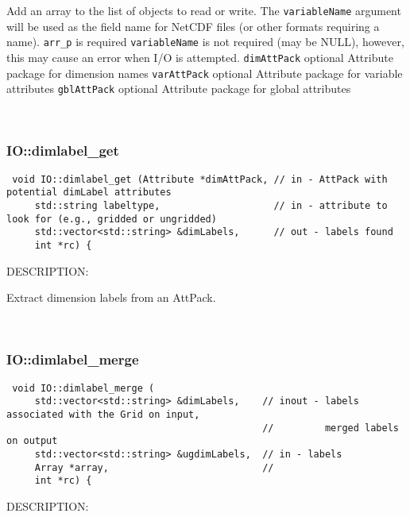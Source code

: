         Add an array to the list of objects to read or write. The
        {\tt variableName} argument will be used as the field name for
        NetCDF files (or other formats requiring a name).
        {\tt arr_p} is required
        {\tt variableName} is not required (may be NULL), however, this
           may cause an error when I/O is attempted.
        {\tt dimAttPack} optional Attribute package for dimension names
        {\tt varAttPack} optional Attribute package for variable attributes
        {\tt gblAttPack} optional Attribute package for global attributes
   
 
\mbox{}\hrulefill\ 
 
\subsubsection [IO::dimlabel\_get] {IO::dimlabel\_get}


  
\begin{verbatim} void IO::dimlabel_get (Attribute *dimAttPack, // in - AttPack with potential dimLabel attributes
     std::string labeltype,                    // in - attribute to look for (e.g., gridded or ungridded)
     std::vector<std::string> &dimLabels,      // out - labels found
     int *rc) {\end{verbatim}
{\sf DESCRIPTION:\\ }


        Extract dimension labels from an AttPack.
   
 
\mbox{}\hrulefill\ 
 
\subsubsection [IO::dimlabel\_merge] {IO::dimlabel\_merge}


  
\begin{verbatim} void IO::dimlabel_merge (
     std::vector<std::string> &dimLabels,    // inout - labels associated with the Grid on input,
                                             //         merged labels on output
     std::vector<std::string> &ugdimLabels,  // in - labels
     Array *array,                           //
     int *rc) {\end{verbatim}
{\sf DESCRIPTION:\\ }


